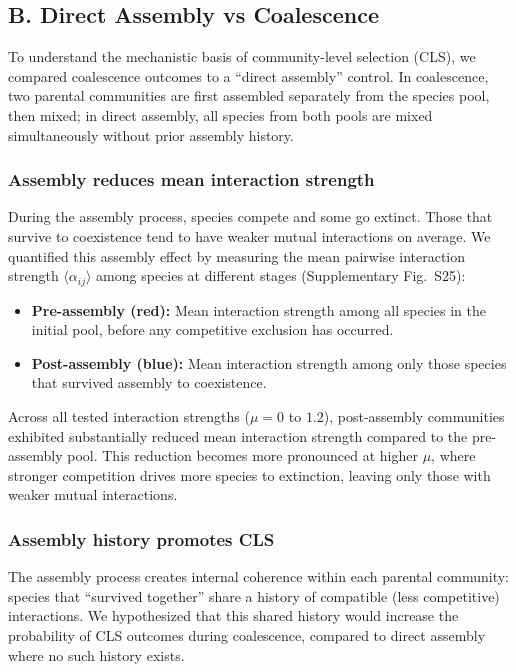 \subsection*{B. Direct Assembly vs Coalescence}
\label{sec:suppl:assembly_effect}

To understand the mechanistic basis of community-level selection (CLS), we compared coalescence outcomes to a ``direct assembly'' control. In coalescence, two parental communities are first assembled separately from the species pool, then mixed; in direct assembly, all species from both pools are mixed simultaneously without prior assembly history.

\subsubsection*{Assembly reduces mean interaction strength}

During the assembly process, species compete and some go extinct. Those that survive to coexistence tend to have weaker mutual interactions on average. We quantified this assembly effect by measuring the mean pairwise interaction strength $\langle \alpha_{ij} \rangle$ among species at different stages (Supplementary Fig.~S25):

\begin{itemize}
    \item \textbf{Pre-assembly (red):} Mean interaction strength among all species in the initial pool, before any competitive exclusion has occurred.
    \item \textbf{Post-assembly (blue):} Mean interaction strength among only those species that survived assembly to coexistence.
\end{itemize}

Across all tested interaction strengths ($\mu = 0$ to $1.2$), post-assembly communities exhibited substantially reduced mean interaction strength compared to the pre-assembly pool. This reduction becomes more pronounced at higher $\mu$, where stronger competition drives more species to extinction, leaving only those with weaker mutual interactions.

\subsubsection*{Assembly history promotes CLS}

The assembly process creates internal coherence within each parental community: species that ``survived together'' share a history of compatible (less competitive) interactions. We hypothesized that this shared history would increase the probability of CLS outcomes during coalescence, compared to direct assembly where no such history exists.

